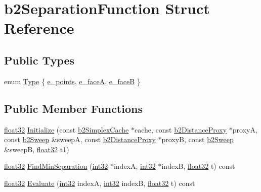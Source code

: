 \hypertarget{structb2_separation_function}{}\section{b2\+Separation\+Function Struct Reference}
\label{structb2_separation_function}
\subsection*{Public Types}
\begin{DoxyCompactItemize}
\item 
enum \mbox{\hyperlink{structb2_separation_function_a8c1446894223e9b6c80dc4d7230141a4}{Type}} \{ \mbox{\hyperlink{structb2_separation_function_a8c1446894223e9b6c80dc4d7230141a4af830d0c5486d2bc9f184845d749c6881}{e\+\_\+points}}, 
\mbox{\hyperlink{structb2_separation_function_a8c1446894223e9b6c80dc4d7230141a4a2b20fea3586ba7dceadfcd76a4257a22}{e\+\_\+faceA}}, 
\mbox{\hyperlink{structb2_separation_function_a8c1446894223e9b6c80dc4d7230141a4a3d70e056a292a2aaf38e8b56c276a713}{e\+\_\+faceB}}
 \}
\end{DoxyCompactItemize}
\subsection*{Public Member Functions}
\begin{DoxyCompactItemize}
\item 
\mbox{\hyperlink{b2_settings_8h_aacdc525d6f7bddb3ae95d5c311bd06a1}{float32}} \mbox{\hyperlink{structb2_separation_function_acfe0bb0d85a5001f1e957eea2137e039}{Initialize}} (const \mbox{\hyperlink{structb2_simplex_cache}{b2\+Simplex\+Cache}} $\ast$cache, const \mbox{\hyperlink{structb2_distance_proxy}{b2\+Distance\+Proxy}} $\ast$proxyA, const \mbox{\hyperlink{structb2_sweep}{b2\+Sweep}} \&sweepA, const \mbox{\hyperlink{structb2_distance_proxy}{b2\+Distance\+Proxy}} $\ast$proxyB, const \mbox{\hyperlink{structb2_sweep}{b2\+Sweep}} \&sweepB, \mbox{\hyperlink{b2_settings_8h_aacdc525d6f7bddb3ae95d5c311bd06a1}{float32}} t1)
\item 
\mbox{\hyperlink{b2_settings_8h_aacdc525d6f7bddb3ae95d5c311bd06a1}{float32}} \mbox{\hyperlink{structb2_separation_function_ac0a603a96343be37d0a0bdf852be1e77}{Find\+Min\+Separation}} (\mbox{\hyperlink{b2_settings_8h_a43d43196463bde49cb067f5c20ab8481}{int32}} $\ast$indexA, \mbox{\hyperlink{b2_settings_8h_a43d43196463bde49cb067f5c20ab8481}{int32}} $\ast$indexB, \mbox{\hyperlink{b2_settings_8h_aacdc525d6f7bddb3ae95d5c311bd06a1}{float32}} t) const
\item 
\mbox{\hyperlink{b2_settings_8h_aacdc525d6f7bddb3ae95d5c311bd06a1}{float32}} \mbox{\hyperlink{structb2_separation_function_a68224ac8a89b10a9d1b39789ccc78d4c}{Evaluate}} (\mbox{\hyperlink{b2_settings_8h_a43d43196463bde49cb067f5c20ab8481}{int32}} indexA, \mbox{\hyperlink{b2_settings_8h_a43d43196463bde49cb067f5c20ab8481}{int32}} indexB, \mbox{\hyperlink{b2_settings_8h_aacdc525d6f7bddb3ae95d5c311bd06a1}{float32}} t) const
\end{DoxyCompactItemize}
